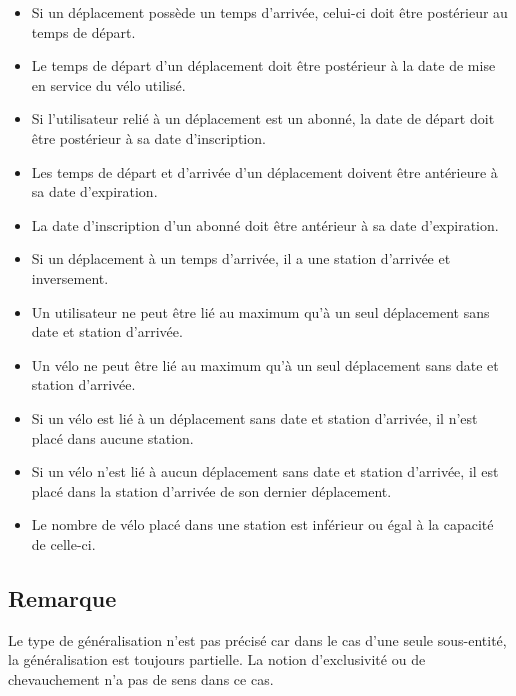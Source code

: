 \documentclass[a4paper, 12pt]{report}
\begin{document}
	\begin{itemize}
		\item Si un déplacement possède un temps d’arrivée, celui-ci doit être postérieur au temps de 			départ.
		
		\item Le temps de départ d’un déplacement doit être postérieur à la date de mise en service 			du vélo utilisé.
		
		\item Si l’utilisateur relié à un déplacement est un abonné, la date de départ doit être 				postérieur à sa date d’inscription.
		
		\item Les temps de départ et d’arrivée d’un déplacement doivent être antérieure à sa date 			d’expiration.
		
		\item La date d’inscription d’un abonné doit être antérieur à sa date d’expiration.
		
		\item Si un déplacement à un temps d’arrivée, il a une station d’arrivée et inversement.
		
		\item Un utilisateur ne peut être lié au maximum qu’à un seul déplacement sans date et 				station d’arrivée.
		
		\item Un vélo ne peut être lié au maximum qu’à un seul déplacement sans date et station 				d’arrivée.
		
		\item Si un vélo est lié à un déplacement sans date et station d’arrivée, il n’est placé dans 			aucune station.
		
		\item Si un vélo n’est lié à aucun déplacement sans date et station d’arrivée, il est placé dans 			la station d’arrivée de son dernier déplacement.
		
		\item Le nombre de vélo placé dans une station est inférieur ou égal à la capacité de celle-ci.
		
	\end{itemize}
	
	\subsection*{Remarque}
		Le type de généralisation n’est pas précisé car dans le cas d’une seule sous-entité, la 			généralisation est toujours partielle. La notion d’exclusivité ou de chevauchement n’a pas de 		sens dans ce cas.
\end{document}

